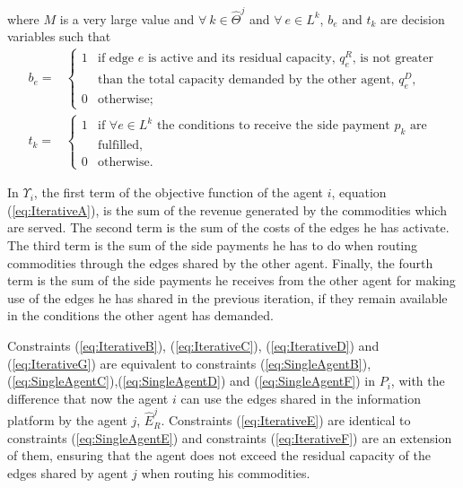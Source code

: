 \documentclass{article}
\begin{document}
where $M$ is a very large value and $\forall\ k\in \widehat{\Theta}^j$ and $\forall\ e \in L^k$, $b_e$ and $t_k$ are decision variables such that
\[
\begin{array}{rl}
b_e = & \begin{cases}
    1 & \text{if edge } e \text{ is active and its residual capacity, } q_e^R\text{, is not greater} \\[-2pt]
    & \text{than the total capacity demanded by the other agent, } q_e^D,\\
    0 & \text{otherwise;}
\end{cases}  \\[20pt]
t_k = &\begin{cases}
    1 & \text{if } \forall e \in L^k \text{ the conditions to receive the side payment } p_k \text{ are} \\[-2pt]
    & \text{fulfilled},\\
    0 & \text{otherwise.}    
\end{cases}
\end{array}
\]

In $\Upsilon_i$, the first term of the objective function of the agent $i$, equation (\ref{eq:IterativeA}), is the sum of the revenue generated by the commodities which are served. The second term is the sum of the costs of the edges he has activate. The third term is the sum of the side payments he has to do when routing commodities through the edges shared by the other agent. Finally, the fourth term is the sum of the side payments he receives from the other agent for making use of the edges he has shared in the previous iteration, if they remain available in the conditions the other agent has demanded.

Constraints (\ref{eq:IterativeB}), (\ref{eq:IterativeC}), (\ref{eq:IterativeD}) and (\ref{eq:IterativeG}) are equivalent to constraints (\ref{eq:SingleAgentB}),(\ref{eq:SingleAgentC}),(\ref{eq:SingleAgentD}) and (\ref{eq:SingleAgentF}) in $P_i$, with the difference that now the agent $i$ can use the edges shared in the information platform by the agent $j$, $\widehat{E}_R^j$. Constraints (\ref{eq:IterativeE}) are identical to constraints (\ref{eq:SingleAgentE}) and constraints (\ref{eq:IterativeF}) are an extension of them, ensuring that the agent does not exceed the residual capacity of the edges shared by agent $j$ when routing his commodities.
\end{document}
